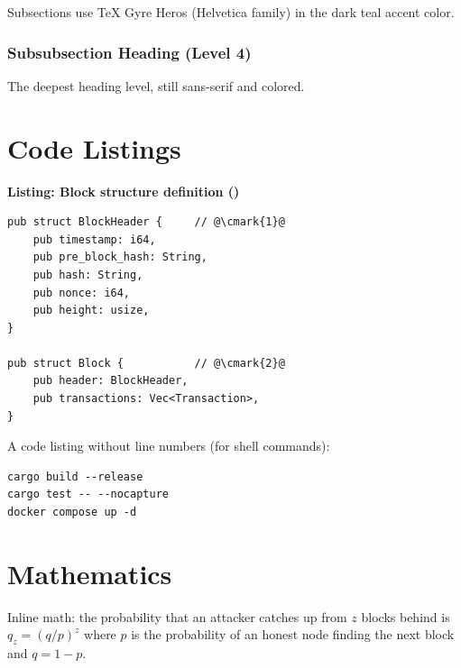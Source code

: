Subsections use TeX Gyre Heros (Helvetica family) in the
\textcolor{sectioncolor}{dark teal} accent color.

\subsubsection{Subsubsection Heading (Level 4)}

The deepest heading level, still sans-serif and colored.

\section{Code Listings}

{\small\sffamily\textbf{Listing: Block structure definition ()}}
\label{lst:block-struct}
\begin{verbatim}
pub struct BlockHeader {     // @\cmark{1}@
    pub timestamp: i64,
    pub pre_block_hash: String,
    pub hash: String,
    pub nonce: i64,
    pub height: usize,
}

pub struct Block {           // @\cmark{2}@
    pub header: BlockHeader,
    pub transactions: Vec<Transaction>,
}
\end{verbatim}

\begin{codeannotations}
\end{codeannotations}

A code listing without line numbers (for shell commands):

\begin{verbatim}
cargo build --release
cargo test -- --nocapture
docker compose up -d
\end{verbatim}

\section{Mathematics}

Inline math: the probability that an attacker catches up from
$z$ blocks behind is $q_z = (q/p)^z$ where $p$ is the probability
of an honest node finding the next block and $q = 1 - p$.

